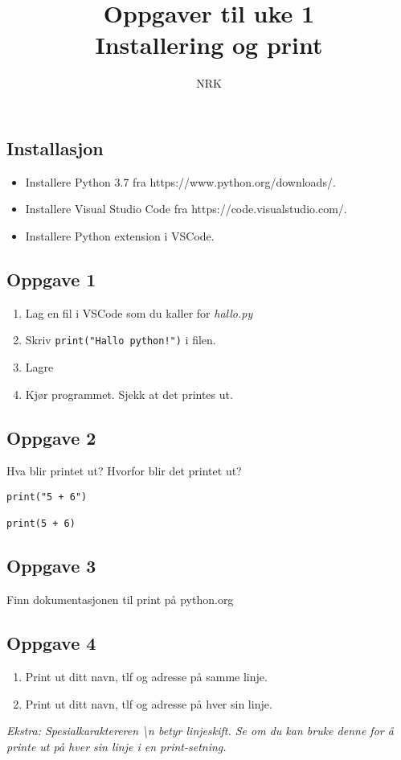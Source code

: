 \documentclass{article}
\title{Oppgaver til uke 1 \\ Installering og print}
\date{}
\author{NRK}
\begin{document}
\maketitle
\noindent

\subsection*{Installasjon}
\begin{itemize}
    \item Installere Python 3.7 fra https://www.python.org/downloads/.
    \item Installere Visual Studio Code fra https://code.visualstudio.com/.
    \item Installere Python extension i VSCode.
\end{itemize}


\subsection*{Oppgave 1}
\begin{enumerate}
    \item Lag en fil i VSCode som du kaller for \textit{hallo.py}
    \item Skriv \texttt{print("Hallo python!")} i filen.
    \item Lagre
    \item Kjør programmet. Sjekk at det printes ut.
\end{enumerate}


\subsection*{Oppgave 2}
Hva blir printet ut? Hvorfor blir det printet ut?

\begin{verbatim}
print("5 + 6")

print(5 + 6)
\end{verbatim}


\subsection*{Oppgave 3}
Finn dokumentasjonen til print på python.org 

\subsection*{Oppgave 4}
\begin{enumerate}
    \item Print ut ditt navn, tlf og adresse på samme linje.
    \item Print ut ditt navn, tlf og adresse på hver sin linje.
\end{enumerate}
 \noindent
\textit{Ekstra: Spesialkaraktereren \textbackslash n betyr linjeskift. Se om du kan bruke denne for å printe ut på hver sin linje i en print-setning.}
\end{document}
